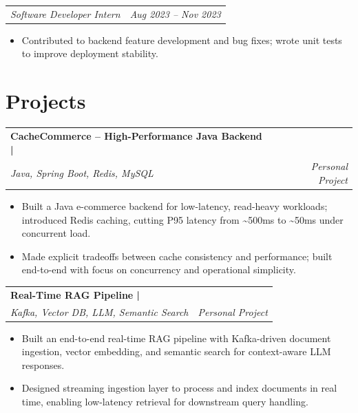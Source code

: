 \documentclass[letterpaper,10pt]{article}
\makeatletter
\newcommand{\resumeItem}[1]{%
  \item\small{#1}%
}
\newcommand{\resumeSubheading}[4]{%
  \vspace{3pt}%
  \begin{tabular*}{\textwidth}{@{}l@{\extracolsep{\fill}}r@{}}
    \textbf{\small #1} & \textbf{\small #2} \\
    \textit{\small #3} & \textit{\small #4} \\
  \end{tabular*}%
  \vspace{-4pt}%
}
\newcommand{\resumeRoleEntry}[2]{%
  \vspace{1pt}%
  \begin{tabular*}{\textwidth}{@{\hspace{6pt}}l@{\extracolsep{\fill}}r@{}}
    \textit{\small #1} & \textit{\small #2} \\
  \end{tabular*}%
  \vspace{-4pt}%
}
\newcommand{\resumeItemListStart}{%
  \begin{itemize}[label=\textbullet, leftmargin=12pt, topsep=2pt, itemsep=0pt, parsep=0pt]%
}
\newcommand{\resumeItemListEnd}{\end{itemize}\vspace{0pt}}
\makeatother
\begin{document}
\resumeRoleEntry{Software Developer Intern}{Aug 2023 -- Nov 2023}
\resumeItemListStart
  \resumeItem{Contributed to backend feature development and bug fixes; wrote unit tests to improve deployment stability.}
\resumeItemListEnd

\section{Projects}

\resumeSubheading
  {CacheCommerce -- High-Performance Java Backend \textnormal{|} \href{https://github.com/abhiishekpawar/cache-demo}{\small\faGithub}}
  {}
  {Java, Spring Boot, Redis, MySQL}{Personal Project} \vspace{1pt}
\resumeItemListStart
  \resumeItem{Built a Java e-commerce backend for low-latency, read-heavy workloads; introduced Redis caching, cutting P95 latency from \textasciitilde500ms to \textasciitilde50ms under concurrent load.}
  \resumeItem{Made explicit tradeoffs between cache consistency and performance; built end-to-end with focus on concurrency and operational simplicity.}
\resumeItemListEnd

\resumeSubheading
  {Real-Time RAG Pipeline \textnormal{|} \href{https://github.com/abhiishekpawar/Real-time-Rag-pipeline}{\small\faGithub}}
  {}
  {Kafka, Vector DB, LLM, Semantic Search}{Personal Project} \vspace{1pt}
\resumeItemListStart
  \resumeItem{Built an end-to-end real-time RAG pipeline with Kafka-driven document ingestion, vector embedding, and semantic search for context-aware LLM responses.}
  \resumeItem{Designed streaming ingestion layer to process and index documents in real time, enabling low-latency retrieval for downstream query handling.}
\resumeItemListEnd

\end{document}

